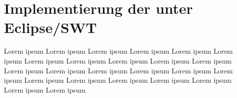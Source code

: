 \section{Implementierung der unter Eclipse/SWT}
Lorem ipsum Lorem ipsum Lorem ipsum Lorem ipsum Lorem ipsum Lorem ipsum Lorem ipsum Lorem ipsum 
Lorem ipsum Lorem ipsum Lorem ipsum Lorem ipsum Lorem ipsum Lorem ipsum Lorem ipsum Lorem ipsum 
Lorem ipsum Lorem ipsum Lorem ipsum Lorem ipsum Lorem ipsum Lorem ipsum Lorem ipsum Lorem ipsum 